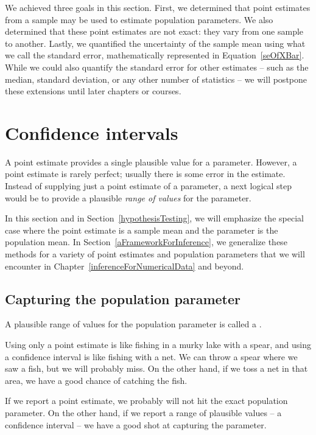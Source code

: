 We achieved three goals in this section. First, we determined that point estimates from a sample may be used to estimate population parameters. We also determined that these point estimates are not exact: they vary from one sample to another. Lastly, we quantified the uncertainty of the sample mean using what we call the standard error, mathematically represented in Equation~\eqref{seOfXBar}. While we could also quantify the standard error for other estimates -- such as the median, standard deviation, or any other number of statistics -- we will postpone these extensions until later chapters or courses.



\section{Confidence intervals}
\label{confidenceIntervals}


A point estimate provides a single plausible value for a parameter. However, a point estimate is rarely perfect; usually there is some error in the estimate. Instead of supplying just a point estimate of a parameter, a next logical step would be to provide a plausible \emph{range of values} for the parameter.

In this section and in Section~\ref{hypothesisTesting}, we will emphasize the special case where the point estimate is a sample mean and the parameter is the population mean. In Section~\ref{aFrameworkForInference}, we generalize these methods for a variety of point estimates and population parameters that we will encounter in Chapter~\ref{inferenceForNumericalData} and beyond.

\subsection{Capturing the population parameter}

A plausible range of values for the population parameter is called a .

Using only a point estimate is like fishing in a murky lake with a spear, and using a confidence interval is like fishing with a net. We can throw a spear where we saw a fish, but we will probably miss. On the other hand, if we toss a net in that area, we have a good chance of catching the fish.

If we report a point estimate, we probably will not hit the exact population parameter. On the other hand, if we report a range of plausible values -- a confidence interval -- we have a good shot at capturing the parameter. 

